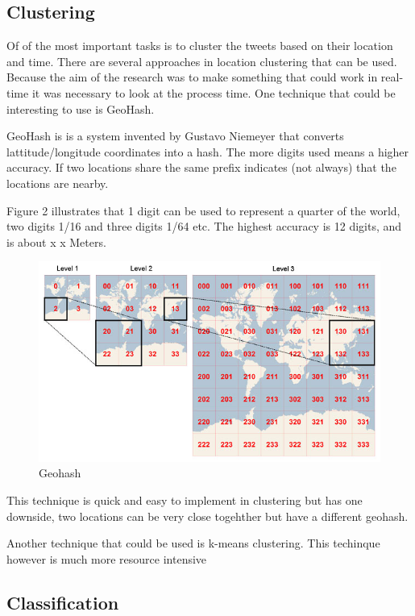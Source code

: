 \documentclass[
10pt, %
a4paper, %
oneside, %
headinclude,footinclude, %
BCOR5mm, %
]{scrartcl}
\begin{document}
\subsection{Clustering}
Of of the most important tasks is to cluster the tweets based on their location and time. There are several approaches in location clustering that can be used. Because the aim of the research was to make something that could work in real-time it was necessary to look at the process time. One technique that could be interesting to use is GeoHash. 

GeoHash is is a system invented by Gustavo Niemeyer that converts lattitude/longitude coordinates into a hash. The more digits used means a higher accuracy. If two locations share the same prefix indicates (not always) that the locations are nearby.

Figure 2 illustrates that 1 digit can be used to represent a quarter of the world, two digits 1/16 and three digits 1/64 etc. The highest accuracy is 12 digits, and is about x x Meters.

\begin{figure}[htbp] %
   \centering
   \includegraphics[width=4.5in]{geohash.jpg} 
   \caption{Geohash}
   \label{fig:geohash}
\end{figure}

This technique is quick and easy to implement in clustering but has one downside, two locations can be very close togehther but have a different  geohash. 

Another technique that could be used is k-means clustering. This techinque however is much more resource intensive %

\subsection{Classification}
\lipsum[3] %
\end{document}
